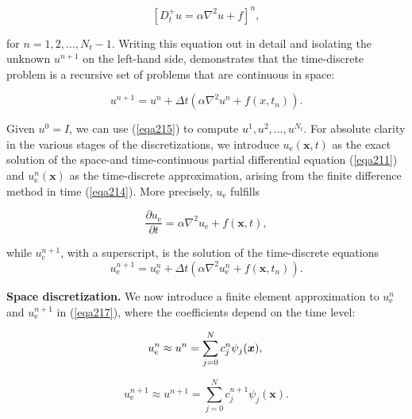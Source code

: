 \documentclass[../main.tex]{subfiles}
\begin{document}
	\begin{equation}
	\label{eqa214}	
		\left[D_{t}^{+} u=\alpha \nabla^{2} u+f\right]^{n},
	\end{equation}

	\noindent for $n=1,2, \ldots, N_{t}-1$. Writing this equation out in detail and isolating the unknown $u^{n+1}$ on the left-hand side, demonstrates that the time-discrete problem is a recursive set of problems that are continuous in space:

	\begin{equation}
	\label{eqa215}	
		u^{n+1}=u^{n}+\Delta t\left(\alpha \nabla^{2} u^{n}+f\left(x, t_{n}\right)\right) .
	\end{equation}

	\noindent Given $u^{0}=I$, we can use (\ref{eqa215}) to compute $u^{1}, u^{2}, \ldots, u^{N_{t}}$.\smallbreak
	For absolute clarity in the various stages of the discretizations, we introduce $u_{\mathrm{e}}(\boldsymbol{x}, t)$ as the exact solution of the space-and time-continuous partial differential equation (\ref{eqa211}) and $u_{\mathrm{e}}^{n}(\boldsymbol{x})$ as the time-discrete approximation, arising from the finite difference method in time (\ref{eqa214}). More precisely, $u_{\mathrm{e}}$ fulfills
		
	\begin{equation}
	\label{eqa216}	
		\frac{\partial u_{\mathrm{e}}}{\partial t}=\alpha \nabla^{2} u_{\mathrm{e}}+f(\boldsymbol{x}, t),
	\end{equation}

	\noindent while $u_{e}^{n+1}$, with a superscript, is the solution of the time-discrete equations
	\begin{equation}
	\label{eqa217}	
		u_{\mathrm{e}}^{n+1}=u_{\mathrm{e}}^{n}+\Delta t\left(\alpha \nabla^{2} u_{\mathrm{e}}^{n}+f\left(\boldsymbol{x}, t_{n}\right)\right) .
	\end{equation}

		\noindent\textbf{Space discretization.  } We now introduce a finite element approximation to $u_{\mathrm{e}}^{n}$ and $u_{\mathrm{e}}^{n+1}$ in (\ref{eqa217}), where the coefficients depend on the time level:
		
		\begin{equation}
			\label{eqa218}	
			u_{\mathrm{e}}^{n} \approx u^{n}=\sum_{j=0}^{N} c_{j}^{n} \psi_{j}(\boldsymbol{x}), \\
		\end{equation}
	
		\begin{equation}
			\label{eqa219}	
			u_{\mathrm{e}}^{n+1} \approx u^{n+1}=\sum_{j=0}^{N} c_{j}^{n+1} \psi_{j}(\boldsymbol{x}) .
		\end{equation}
	
\end{document}
